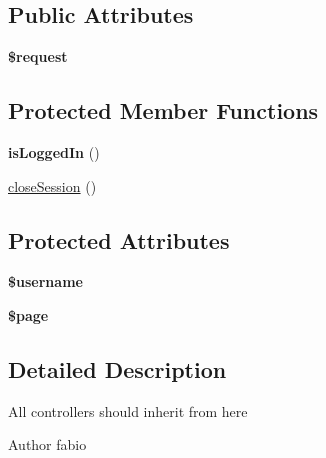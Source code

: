 \subsection*{Public Attributes}
\begin{DoxyCompactItemize}
\item 
\hypertarget{classController_ae09902e0cf33dbffd52349e056794842}{{\bfseries \$request}}\label{classController_ae09902e0cf33dbffd52349e056794842}

\end{DoxyCompactItemize}
\subsection*{Protected Member Functions}
\begin{DoxyCompactItemize}
\item 
\hypertarget{classController_a014e1cea4dd7e6fb8fad83cdce9c6216}{{\bfseries is\+Logged\+In} ()}\label{classController_a014e1cea4dd7e6fb8fad83cdce9c6216}

\item 
\hyperlink{classController_a67beb590eef4f36b07e6c9ef04fc8337}{close\+Session} ()
\end{DoxyCompactItemize}
\subsection*{Protected Attributes}
\begin{DoxyCompactItemize}
\item 
\hypertarget{classController_add0ea4a4a72b2f7cf707bdd435a67c61}{{\bfseries \$username}}\label{classController_add0ea4a4a72b2f7cf707bdd435a67c61}

\item 
\hypertarget{classController_a82584774d202d57e2e5159fa2add1079}{{\bfseries \$page}}\label{classController_a82584774d202d57e2e5159fa2add1079}

\end{DoxyCompactItemize}


\subsection{Detailed Description}
All controllers should inherit from here

\begin{DoxyAuthor}{Author}
fabio 
\end{DoxyAuthor}


